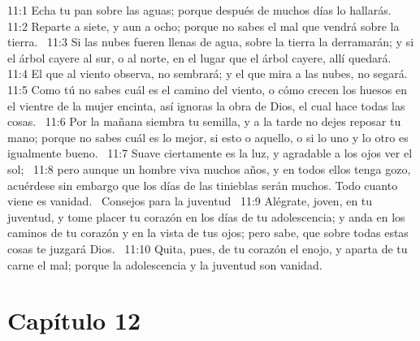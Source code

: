 11:1 Echa tu pan sobre las aguas; porque después de muchos días lo hallarás.  
11:2 Reparte a siete, y aun a ocho; porque no sabes el mal que vendrá sobre la tierra.  
11:3 Si las nubes fueren llenas de agua, sobre la tierra la derramarán; y si el árbol cayere al sur, o al norte, en el lugar que el árbol cayere, allí quedará.  
11:4 El que al viento observa, no sembrará; y el que mira a las nubes, no segará.  
11:5 Como tú no sabes cuál es el camino del viento, o cómo crecen los huesos en el vientre de la mujer encinta, así ignoras la obra de Dios, el cual hace todas las cosas.  
11:6 Por la mañana siembra tu semilla, y a la tarde no dejes reposar tu mano; porque no sabes cuál es lo mejor, si esto o aquello, o si lo uno y lo otro es igualmente bueno.  
11:7 Suave ciertamente es la luz, y agradable a los ojos ver el sol;  
11:8 pero aunque un hombre viva muchos años, y en todos ellos tenga gozo, acuérdese sin embargo que los días de las tinieblas serán muchos. Todo cuanto viene es vanidad.  
Consejos para la juventud  
11:9 Alégrate, joven, en tu juventud, y tome placer tu corazón en los días de tu adolescencia; y anda en los caminos de tu corazón y en la vista de tus ojos; pero sabe, que sobre todas estas cosas te juzgará Dios.  
11:10 Quita, pues, de tu corazón el enojo, y aparta de tu carne el mal; porque la adolescencia y la juventud son vanidad.  
\section*{Capítulo 12 }

